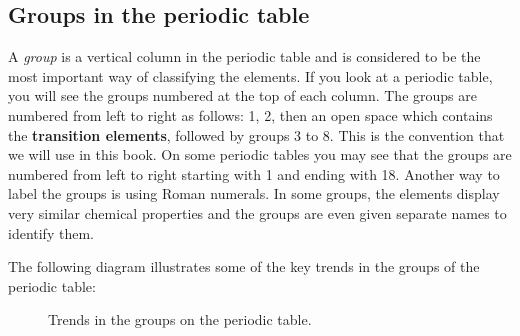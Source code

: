 \subsection*{Groups in the periodic table}
            \nopagebreak
            \label{m38760*id261554}A \textsl{group} is a vertical column in the periodic table and is considered to be the most important way of classifying the elements. If you look at a periodic table, you will see the groups numbered at the top of each column. The groups are numbered from left to right  as follows: 1, 2, then an open space which contains the \textbf{transition elements}, followed by groups 3 to 8.  This is the convention that we will use in this book. On some periodic tables you may see that the groups are numbered from left to right starting with 1 and ending with 18. Another way to label the groups is using Roman numerals. In some groups, the elements display very similar chemical properties and the groups are even given separate names to identify them.\par 
        \label{m38760*id261833}The following diagram illustrates some of the key trends in the groups of the periodic table: \\
\begin{figure}[H]

\begin{center}
\end{center}
\caption{Trends in the groups on the periodic table.}
\label{fig:atom:periodic1}
 \end{figure} 
